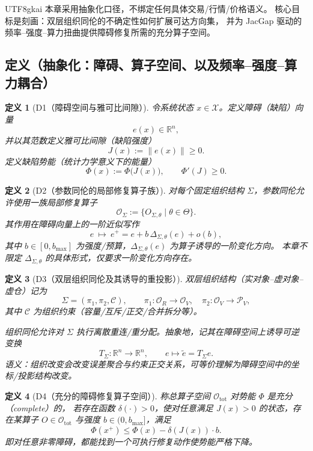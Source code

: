 \documentclass[12pt]{article}
\newtheorem{definition}{定义}[section]
\newcommand{\RR}{\mathbb{R}}
\begin{document}
\begin{CJK*}{UTF8}{gkai}
本章采用抽象化口径，不绑定任何具体交易/行情/价格语义。
核心目标是刻画：双层组织同伦的不确定性如何扩展可达方向集，
并为 JacGap 驱动的频率--强度--算力扭曲提供障碍修复所需的充分算子空间。

\subsection{定义（抽象化：障碍、算子空间、以及频率--强度--算力耦合）}
\label{subsec:tex28-ch9-defs}

\begin{definition}[D1（障碍空间与雅可比间隙）]
\label{def:tex28-ch9-d1}
令系统状态 $x\in\mathcal{X}$。定义障碍（缺陷）向量
\[
  e(x)\in\RR^n,
\]
并以其范数定义雅可比间隙（缺陷强度）
\[
  J(x):=\|e(x)\|\ge 0.
\]
定义缺陷势能（统计力学意义下的能量）
\[
  \Phi(x):=\Phi\bigl(J(x)\bigr),
  \qquad
  \Phi'(J)\ge 0.
\]
\end{definition}

\begin{definition}[D2（参数同伦的局部修复算子族）]
\label{def:tex28-ch9-d2}
对每个固定组织结构 $\Sigma$，参数同伦允许使用一族局部修复算子
\[
  \mathcal{O}_{\Sigma}:=\{O_{\Sigma,\theta}\mid \theta\in\Theta\}.
\]
其作用在障碍向量上的一阶近似写作
\[
  e\ \mapsto\ e^{+}=e+b\,\Delta_{\Sigma,\theta}(e)+o(b),
\]
其中 $b\in[0,b_{\max}]$ 为强度/预算，$\Delta_{\Sigma,\theta}(e)$ 为算子诱导的一阶变化方向。
本章不限定 $\Delta_{\Sigma,\theta}$ 的具体形式，仅要求一阶变化方向存在。
\end{definition}

\begin{definition}[D3（双层组织同伦及其诱导的重投影）]
\label{def:tex28-ch9-d3}
双层组织结构（实对象--虚对象--虚仓）记为
\[
  \Sigma=(\pi_1,\pi_2,\mathcal{C}),
  \qquad
  \pi_1:\mathcal{O}_R\to\mathcal{O}_V,\quad
  \pi_2:\mathcal{O}_V\to\mathcal{P}_V,
\]
其中 $\mathcal{C}$ 为组织约束（容量/互斥/正交/合并拆分等）。

组织同伦允许对 $\Sigma$ 执行离散重连/重分配。抽象地，记其在障碍空间上诱导可逆变换
\[
  T_{\Sigma}:\RR^n\to\RR^n,\qquad e\mapsto \tilde e=T_{\Sigma}e.
\]
语义：组织改变会改变误差聚合与约束正交关系，可等价理解为障碍空间中的坐标/投影结构改变。
\end{definition}

\begin{definition}[D4（充分的障碍修复算子空间）]
\label{def:tex28-ch9-d4}
称总算子空间 $\mathcal{O}_{\mathrm{tot}}$ 对势能 $\Phi$ 是充分（complete）的，
若存在函数 $\delta(\cdot)>0$，使对任意满足 $J(x)>0$ 的状态，存在某算子 $O\in\mathcal{O}_{\mathrm{tot}}$
与强度 $b\in(0,b_{\max}]$，满足
\[
  \Phi(x^{+})\le \Phi(x)-\delta(J(x))\cdot b.
\]
即对任意非零障碍，都能找到一个可执行修复动作使势能严格下降。
\end{definition}


\end{CJK*}
\end{document}
